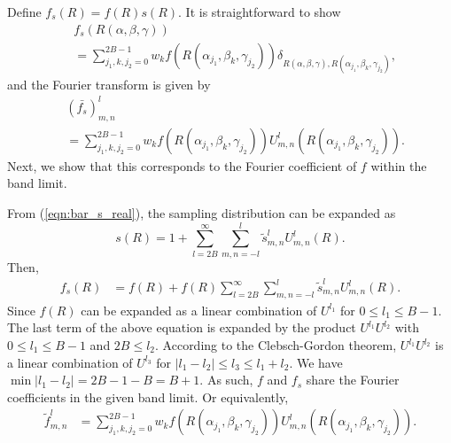 \documentclass[onecolumn,11pt]{IEEEtran}
\newcommand{\refeqn}[1]{(\ref{eqn:#1})}
\begin{document}
Define $f_s(R)=f(R) s(R)$. 
It is straightforward to show
\begin{align*}
&f_s(R(\alpha,\beta,\gamma))\\
& = 
\sum_{j_1,k,j_2=0}^{2B-1} w_k f(R(\alpha_{j_1},\beta_k,\gamma_{j_2})) 
\delta_{R(\alpha,\beta,\gamma),R(\alpha_{j_1},\beta_k,\gamma_{j_2})},
\end{align*}
and the Fourier transform is given by
\begin{align*}
&(\bar{f_s})^l_{m,n}\\
& = 
\sum_{j_1,k,j_2=0}^{2B-1} w_k f(R(\alpha_{j_1},\beta_k,\gamma_{j_2})) 
{U^l_{m,n}(R(\alpha_{j_1},\beta_k,\gamma_{j_2}))}.
\end{align*}
Next, we show that this corresponds to the Fourier coefficient of $f$ within the band limit. 

From \refeqn{bar_s_real}, the sampling distribution can be expanded as
\[
s(R)=1+\sum_{l=2B}^\infty \sum_{m,n=-l}^l \tilde s^l_{m,n} U^l_{m,n}(R).
\]
Then,
\begin{align*}
    f_s(R)&=f(R)+f(R)\sum_{l=2B}^\infty \sum_{m,n=-l}^l \tilde s^l_{m,n} U^l_{m,n}(R).
\end{align*}
Since $f(R)$ can be expanded as a linear combination of $U^{l_1}$ for $0\leq l_1 \leq B-1$. 
The last term of the above equation is expanded by the product $U^{l_1}U^{l_2}$ with $0\leq l_1 \leq B-1$  and $2B\leq l_2$. 
According to the Clebsch-Gordon theorem, $U^{l_1}U^{l_2}$ is a linear combination of $U^{l_3}$ for $|l_1-l_2|\leq l_3 \leq l_1+l_2$. 
We have $\min|l_1-l_2|=2B-1-B=B+1$. 
As such, $f$ and $f_s$ share the Fourier coefficients in the given band limit. 
Or equivalently, 
\begin{align}
    \tilde f^l_{m,n}
    & = 
    \sum_{j_1,k,j_2=0}^{2B-1} w_k f(R(\alpha_{j_1},\beta_k,\gamma_{j_2})) {U^l_{m,n}(R(\alpha_{j_1},\beta_k,\gamma_{j_2}))}.
\end{align}
\end{document}
